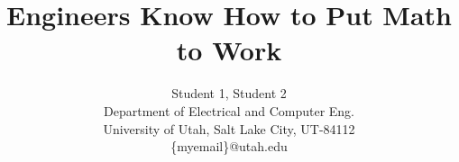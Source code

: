 \documentclass[journal]{IEEEtran}
\begin{document}


\title{Engineers Know How to Put Math to Work}
\author{Student 1, Student 2\\
Department of  Electrical and Computer Eng.\\
University of Utah, Salt Lake City, UT-84112\\\{myemail\}@utah.edu }


\maketitle








\end{document}
